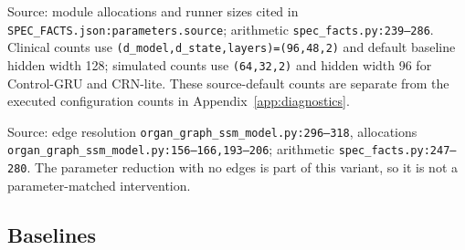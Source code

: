 Source: module allocations and runner sizes cited in \texttt{SPEC\_\allowbreak{}FACTS.\allowbreak{}json:\allowbreak{}parameters.\allowbreak{}source}; arithmetic \texttt{spec\_\allowbreak{}facts.\allowbreak{}py:\allowbreak{}239–\allowbreak{}286}. Clinical counts use \texttt{(d\_\allowbreak{}model,\allowbreak{}d\_\allowbreak{}state,\allowbreak{}layers)=\allowbreak{}(96,\allowbreak{}48,\allowbreak{}2)} and default baseline hidden width 128; simulated counts use \texttt{(64,\allowbreak{}32,\allowbreak{}2)} and hidden width 96 for Control-GRU and CRN-lite. These source-default counts are separate from the executed configuration counts in Appendix~\ref{app:diagnostics}.

\begin{center}
\small
{}
\ifdim\wd0>\textwidth\resizebox{\textwidth}{!}{\usebox0}\else\usebox0\fi
\end{center}


Source: edge resolution \texttt{organ\_\allowbreak{}graph\_\allowbreak{}ssm\_\allowbreak{}model.\allowbreak{}py:\allowbreak{}296–\allowbreak{}318}, allocations \texttt{organ\_\allowbreak{}graph\_\allowbreak{}ssm\_\allowbreak{}model.\allowbreak{}py:\allowbreak{}156–\allowbreak{}166,\allowbreak{}193–\allowbreak{}206}; arithmetic \texttt{spec\_\allowbreak{}facts.\allowbreak{}py:\allowbreak{}247–\allowbreak{}280}. The parameter reduction with no edges is part of this variant, so it is not a parameter-matched intervention.

\subsection{Baselines}


